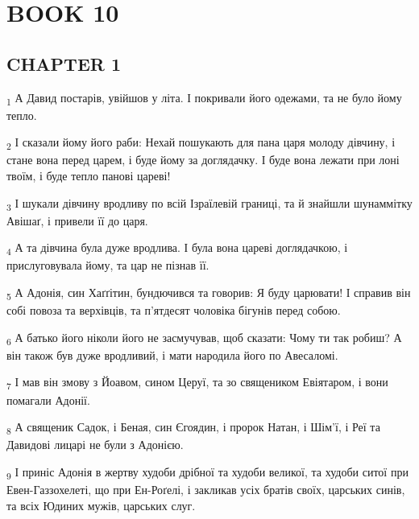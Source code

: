 \section{BOOK 10}
\subsection{CHAPTER 1}
\begin{tcolorbox}
\textsubscript{1} А Давид постарів, увійшов у літа. І покривали його одежами, та не було йому тепло.
\end{tcolorbox}
\begin{tcolorbox}
\textsubscript{2} І сказали йому його раби: Нехай пошукають для пана царя молоду дівчину, і стане вона перед царем, і буде йому за доглядачку. І буде вона лежати при лоні твоїм, і буде тепло панові цареві!
\end{tcolorbox}
\begin{tcolorbox}
\textsubscript{3} І шукали дівчину вродливу по всій Ізраїлевій границі, та й знайшли шунаммітку Авішаґ, і привели її до царя.
\end{tcolorbox}
\begin{tcolorbox}
\textsubscript{4} А та дівчина була дуже вродлива. І була вона цареві доглядачкою, і прислуговувала йому, та цар не пізнав її.
\end{tcolorbox}
\begin{tcolorbox}
\textsubscript{5} А Адонія, син Хаґґітин, бундючився та говорив: Я буду царювати! І справив він собі повоза та верхівців, та п'ятдесят чоловіка бігунів перед собою.
\end{tcolorbox}
\begin{tcolorbox}
\textsubscript{6} А батько його ніколи його не засмучував, щоб сказати: Чому ти так робиш? А він також був дуже вродливий, і мати народила його по Авесаломі.
\end{tcolorbox}
\begin{tcolorbox}
\textsubscript{7} І мав він змову з Йоавом, сином Церуї, та зо священиком Евіятаром, і вони помагали Адонії.
\end{tcolorbox}
\begin{tcolorbox}
\textsubscript{8} А священик Садок, і Беная, син Єгоядин, і пророк Натан, і Шім'ї, і Реї та Давидові лицарі не були з Адонією.
\end{tcolorbox}
\begin{tcolorbox}
\textsubscript{9} І приніс Адонія в жертву худоби дрібної та худоби великої, та худоби ситої при Евен-Газзохелеті, що при Ен-Роґелі, і закликав усіх братів своїх, царських синів, та всіх Юдиних мужів, царських слуг.
\end{tcolorbox}
